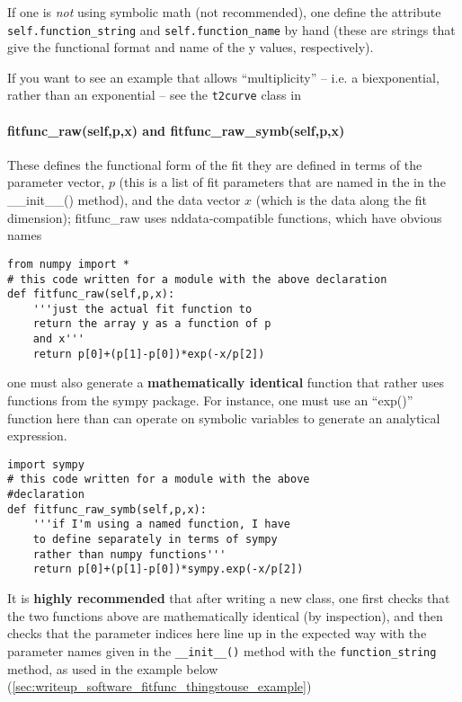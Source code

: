 If one is {\it not} using symbolic math (not recommended),
    one define the attribute {\tt self.function\_string} and {\tt self.function\_name}
    by hand (these are strings that give the functional format and name of the y values,
    respectively).

If you want to see an example that allows ``multiplicity'' -- i.e. a
    biexponential, rather than an exponential -- see the \texttt{t2curve} class
    in 
\paragraph{fitfunc\_raw(self,p,x) and fitfunc\_raw\_symb(self,p,x)}
These defines the functional form of the fit
    they are defined in terms of the parameter vector, $p$
    (this is a list of fit parameters that are named in
    the in the \_\_init\_\_() method),
    and the data vector $x$ (which is the data along
    the fit dimension);
fitfunc\_raw uses nddata-compatible functions, which have obvious names
\begin{lstlisting}
from numpy import *
# this code written for a module with the above declaration
def fitfunc_raw(self,p,x):
    '''just the actual fit function to
    return the array y as a function of p
    and x'''
    return p[0]+(p[1]-p[0])*exp(-x/p[2])
\end{lstlisting}
one must also generate a {\bf mathematically identical}
    function that rather uses functions from the sympy package.
For instance, one must use an ``exp()'' function here
    than can operate on symbolic variables to generate
    an analytical expression.
\begin{lstlisting}
import sympy
# this code written for a module with the above
#declaration
def fitfunc_raw_symb(self,p,x):
    '''if I'm using a named function, I have
    to define separately in terms of sympy
    rather than numpy functions'''
    return p[0]+(p[1]-p[0])*sympy.exp(-x/p[2])
\end{lstlisting}
It is {\bf highly recommended} that after writing a new class,
    one first checks that the two functions above are mathematically identical (by inspection),
    and then checks that the parameter indices here
    line up in the expected way with the parameter
    names given in the {\tt \_\_init\_\_()} method
    with the {\tt function\_string} method, as used in the example
    below (\ref{sec:writeup_software_fitfunc_thingstouse_example})
